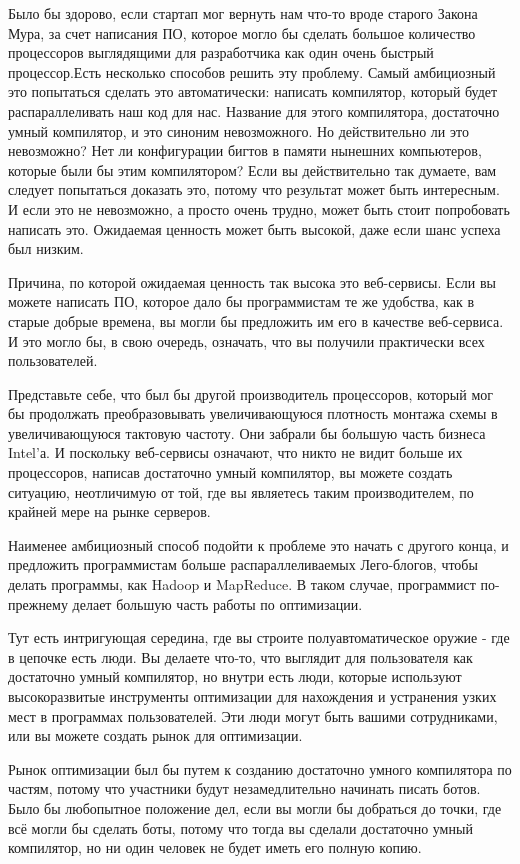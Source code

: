 \documentclass[ebook,12pt,oneside,openany]{memoir}
\begin{document}
Было бы здорово, если стартап мог вернуть нам что-то вроде старого
Закона Мура, за счет написания ПО, которое могло бы сделать большое
количество процессоров выглядящими для разработчика как один очень
быстрый процессор.Есть несколько способов решить эту проблему. Самый
амбициозный это попытаться сделать это автоматически: написать
компилятор, который будет распараллеливать наш код для нас. Название
для этого компилятора, достаточно умный компилятор, и это синоним
невозможного. Но действительно ли это невозможно? Нет ли конфигурации
бигтов в памяти нынешних компьютеров, которые были бы этим
компилятором? Если вы действительно так думаете, вам следует
попытаться доказать это, потому что результат может быть интересным. И
если это не невозможно, а просто очень трудно, может быть стоит
попробовать написать это. Ожидаемая ценность может быть высокой, даже
если шанс успеха был низким.

Причина, по которой ожидаемая ценность так высока это веб-сервисы.
Если вы можете написать ПО, которое дало бы программистам те же
удобства, как в старые добрые времена, вы могли бы предложить им его в
качестве веб-сервиса. И это могло бы, в свою очередь, означать, что вы
получили практически всех пользователей.

Представьте себе, что был бы другой производитель процессоров, который
мог бы продолжать преобразовывать увеличивающуюся плотность монтажа
схемы в увеличивающуюся тактовую частоту. Они забрали бы большую часть
бизнеса Intel’а. И поскольку веб-сервисы означают, что никто не видит
больше их процессоров, написав достаточно умный компилятор, вы можете
создать ситуацию, неотличимую от той, где вы являетесь таким
производителем, по крайней мере на рынке серверов.

Наименее амбициозный способ подойти к проблеме это начать с другого
конца, и предложить программистам больше распараллеливаемых
Лего-блогов, чтобы делать программы, как Hadoop и MapReduce. В таком
случае, программист по-прежнему делает большую часть работы по
оптимизации.

Тут есть интригующая середина, где вы строите полуавтоматическое
оружие - где в цепочке есть люди. Вы делаете что-то, что выглядит для
пользователя как достаточно умный компилятор, но внутри есть люди,
которые используют высокоразвитые инструменты оптимизации для
нахождения и устранения узких мест в программах пользователей. Эти
люди могут быть вашими сотрудниками, или вы можете создать рынок для
оптимизации.

Рынок оптимизации был бы путем к созданию достаточно умного
компилятора по частям, потому что участники будут незамедлительно
начинать писать ботов. Было бы любопытное положение дел, если вы могли
бы добраться до точки, где всё могли бы сделать боты, потому что тогда
вы сделали достаточно умный компилятор, но ни один человек не будет
иметь его полную копию.
\end{document}
